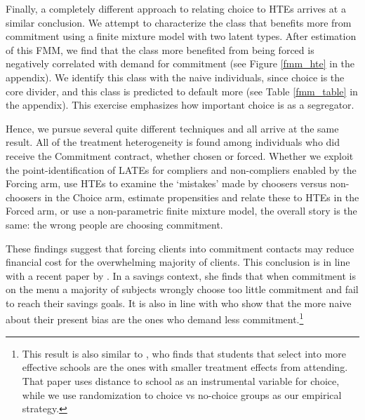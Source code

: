 \documentclass[oneside,11pt]{article}
\begin{document}
Finally, a completely different approach to relating choice to HTEs arrives at a similar conclusion.  We attempt to characterize the class that benefits more from commitment using a finite mixture model with two latent types. After estimation of this FMM, we find that the class more benefited from being forced is negatively correlated with demand for commitment (see Figure \ref{fmm_hte} in the appendix). We identify this class with the naive individuals, since choice is the core divider, and this class is predicted to default more (see Table \ref{fmm_table} in the appendix). This exercise emphasizes how important choice is as a segregator.





Hence, we pursue several quite different techniques and all arrive at the same result.  All of the treatment heterogeneity is found among individuals who did receive the Commitment contract, whether chosen or forced.  Whether we exploit the point-identification of LATEs for compliers and non-compliers enabled by the Forcing arm, use HTEs to examine the `mistakes' made by choosers versus non-choosers in the Choice arm, estimate propensities and relate these to HTEs in the Forced arm, or use a non-parametric finite mixture model, the overall story is the same:  the wrong people are choosing commitment.


These findings suggest that forcing clients into commitment contacts may reduce financial cost for the overwhelming majority of clients. 
This conclusion is in line with a recent paper by \cite{John}. In a savings context, she finds that when commitment is on the menu a majority of subjects wrongly choose too little commitment and fail to reach their savings goals. It is also in line with \cite{Sprenger} who show that the more naive about their present bias are the ones who demand less commitment.\footnote{This result is also similar to \cite{Walters}, who finds that students that select into more effective schools are the ones with smaller treatment effects from attending.  That paper uses distance to school as an instrumental variable for choice, while we use randomization to choice vs no-choice groups as our empirical strategy.}
\end{document}
